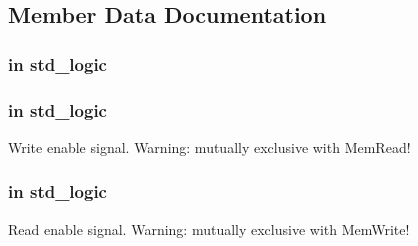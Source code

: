 \subsection{\-Member \-Data \-Documentation}
\hypertarget{classdata__memory_a78bd51cc257fe0e8fa69227fc1865a8e}{
\subsubsection[{clk}]{ {\bfseries in } {\bfseries std\-\_\-logic } }}\label{classdata__memory_a78bd51cc257fe0e8fa69227fc1865a8e}
\hypertarget{classdata__memory_a20b873e427ea4a28cb74ec7d495730d8}{
\subsubsection[{\-Mem\-Write}]{ {\bfseries in } {\bfseries std\-\_\-logic } }}\label{classdata__memory_a20b873e427ea4a28cb74ec7d495730d8}


\-Write enable signal. \-Warning\-: mutually exclusive with \-Mem\-Read! 

\hypertarget{classdata__memory_a24c8cc235a5d3a2ce36383b15a577f8e}{
\subsubsection[{\-Mem\-Read}]{ {\bfseries in } {\bfseries std\-\_\-logic } }}\label{classdata__memory_a24c8cc235a5d3a2ce36383b15a577f8e}


\-Read enable signal. \-Warning\-: mutually exclusive with \-Mem\-Write! 

